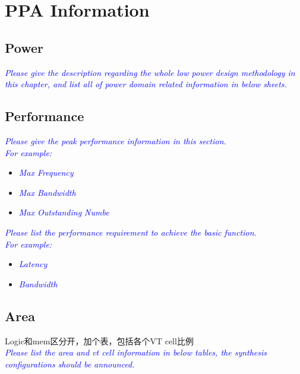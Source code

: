 
\clearpage

\section{PPA Information}
\subsection{Power}
\noindent\textit{\small\textcolor{blue}{Please give the description regarding the whole low power design methodology in this chapter, and list all of power domain related information in below sheets.}}

\subsection{Performance}
\noindent\textit{\small\textcolor{blue}{Please give the peak performance information in this section.\\
For example:}}
\begin{itemize}
    \item \noindent\textit{\small\textcolor{blue}{Max Frequency}}
    \item \noindent\textit{\small\textcolor{blue}{Max Bandwidth}}
    \item \noindent\textit{\small\textcolor{blue}{Max Outstanding Numbe}} \\
\end{itemize}

\noindent\textit{\small\textcolor{blue}{Please list the performance requirement to achieve the basic function.\\
For example:}}

\begin{itemize}
    \item \noindent\textit{\small\textcolor{blue}{Latency}}
    \item \noindent\textit{\small\textcolor{blue}{Bandwidth}}
\end{itemize}

\subsection{Area}
{Logic和mem区分开，加个表，包括各个VT cell比例\\}
\noindent\textit{\small\textcolor{blue}{Please list the area and vt cell information in below tables, the synthesis configurations should be announced.}}
